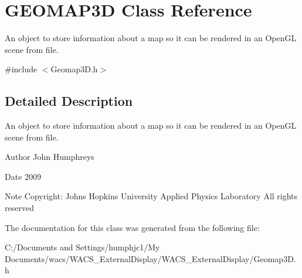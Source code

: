 \hypertarget{class_g_e_o_m_a_p3_d}{
\section{GEOMAP3D Class Reference}
\label{class_g_e_o_m_a_p3_d}
}


An object to store information about a map so it can be rendered in an OpenGL scene from file.  




{\ttfamily \#include $<$Geomap3D.h$>$}



\subsection{Detailed Description}
An object to store information about a map so it can be rendered in an OpenGL scene from file. 

\begin{DoxyAuthor}{Author}
John Humphreys 
\end{DoxyAuthor}
\begin{DoxyDate}{Date}
2009 
\end{DoxyDate}
\begin{DoxyNote}{Note}
Copyright: Johns Hopkins University Applied Physics Laboratory All rights reserved 
\end{DoxyNote}


The documentation for this class was generated from the following file:\begin{DoxyCompactItemize}
\item 
C:/Documents and Settings/humphjc1/My Documents/wacs/WACS\_\-ExternalDisplay/WACS\_\-ExternalDisplay/Geomap3D.h\end{DoxyCompactItemize}

